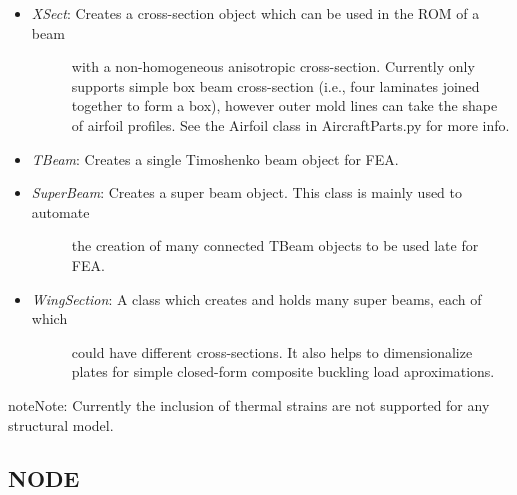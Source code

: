 \documentclass[letterpaper,10pt,english]{sphinxmanual}
\begin{document}
\begin{itemize}
\begin{description}
\end{description}

\item {} \begin{description}
\item[{\emph{XSect}: Creates a cross-section object which can be used in the ROM of a beam}] \leavevmode
with a non-homogeneous anisotropic cross-section. Currently only supports
simple box beam cross-section (i.e., four laminates joined together to form
a box), however outer mold lines can take the shape of airfoil profiles.
See the Airfoil class in AircraftParts.py for more info.

\end{description}

\item {} 
\emph{TBeam}: Creates a single Timoshenko beam object for FEA.

\item {} \begin{description}
\item[{\emph{SuperBeam}: Creates a super beam object. This class is mainly used to automate}] \leavevmode
the creation of many connected TBeam objects to be used late for FEA.

\end{description}

\item {} \begin{description}
\item[{\emph{WingSection}: A class which creates and holds many super beams, each of which}] \leavevmode
could have different cross-sections. It also helps to dimensionalize
plates for simple closed-form composite buckling load aproximations.

\end{description}

\end{itemize}

\begin{notice}{note}{Note:}
Currently the inclusion of thermal strains are not supported for any
structural model.
\end{notice}


\subsection{NODE}
\label{structures:node}
\end{document}
